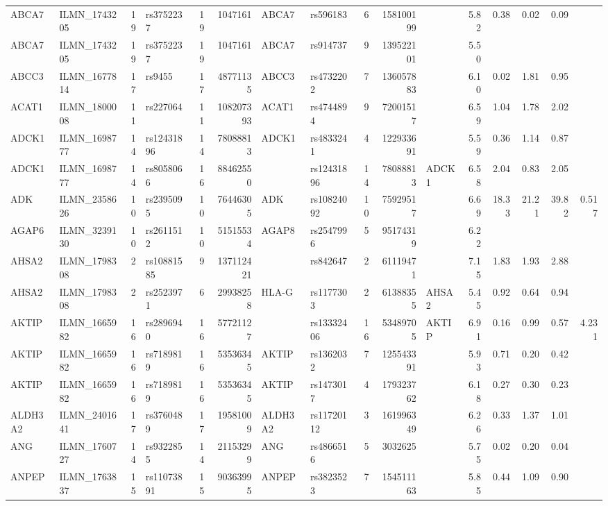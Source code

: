 \documentclass{article}
\begin{document}
\begin{landscape}
{\begin{ThreePartTable}
\begin{longtable}{|llr|lrrl|lrrl|rrrr|r|}
ABCA7 & ILMN\_1743205 & 19 & rs3752237 & 19 & 1047161 & ABCA7 & rs596183 & 6 & 158100199 &  & 5.82 & 0.38\tnote{i} & 0.02\tnote{i} & 0.09\tnote{j} &  \\
ABCA7 & ILMN\_1743205 & 19 & rs3752237 & 19 & 1047161 & ABCA7 & rs914737 & 9 & 139522101 &  & 5.50 &  &  &  &  \\
ABCC3 & ILMN\_1677814 & 17 & rs9455 & 17 & 48771135 & ABCC3 & rs4732202 & 7 & 136057883 &  & 6.10 & 0.02 & 1.81 & 0.95 &  \\
ACAT1 & ILMN\_1800008 & 11 & rs227064 & 11 & 108207393 & ACAT1 & rs4744894 & 9 & 72001517 &  & 6.59 & 1.04 & 1.78 & 2.02 &  \\
ADCK1 & ILMN\_1698777 & 14 & rs12431896 & 14 & 78088813 & ADCK1 & rs4833241 & 4 & 122933691 &  & 5.59 & 0.36 & 1.14 & 0.87 &  \\
ADCK1 & ILMN\_1698777 & 14 & rs8058066 & 16 & 88462550 &  & rs12431896 & 14 & 78088813 & ADCK1 & 6.58 & 2.04 & 0.83 & 2.05 &  \\
ADK & ILMN\_2358626 & 10 & rs2395095 & 10 & 76446305 & ADK & rs10824092 & 10 & 75929517 &  & 6.69 & 18.33 & 21.21 & 39.82 & 0.517 \\
AGAP6 & ILMN\_3239130 & 10 & rs2611512 & 10 & 51515534 & AGAP8 & rs2547996 & 5 & 95174319 &  & 6.22 &  &  &  &  \\
AHSA2 & ILMN\_1798308 & 2 & rs10881585 & 9 & 137112421 &  & rs842647 & 2 & 61119471 &  & 7.15 & 1.83 & 1.93 & 2.88 &  \\
AHSA2 & ILMN\_1798308 & 2 & rs2523971 & 6 & 29938258 & HLA-G & rs1177303 & 2 & 61388355 & AHSA2 & 5.45 & 0.92 & 0.64 & 0.94 &  \\
AKTIP & ILMN\_1665982 & 16 & rs2896940 & 16 & 57721127 &  & rs13332406 & 16 & 53489705 & AKTIP & 6.91 & 0.16 & 0.99 & 0.57 & 4.231 \\
AKTIP & ILMN\_1665982 & 16 & rs7189819 & 16 & 53536345 & AKTIP & rs1362032 & 7 & 125543391 &  & 5.93 & 0.71 & 0.20 & 0.42 &  \\
AKTIP & ILMN\_1665982 & 16 & rs7189819 & 16 & 53536345 & AKTIP & rs1473017 & 4 & 179323762 &  & 6.18 & 0.27 & 0.30 & 0.23 &  \\
ALDH3A2 & ILMN\_2401641 & 17 & rs3760489 & 17 & 19581009 & ALDH3A2 & rs11720112 & 3 & 161996349 &  & 6.26 & 0.33 & 1.37 & 1.01 &  \\
ANG & ILMN\_1760727 & 14 & rs9322855 & 14 & 21153299 & ANG & rs4866516 & 5 & 3032625 &  & 5.75 & 0.02 & 0.20 & 0.04 &  \\
ANPEP & ILMN\_1763837 & 15 & rs11073891 & 15 & 90363995 & ANPEP & rs3823523 & 7 & 154511163 &  & 5.85 & 0.44 & 1.09 & 0.90 &  \\

\end{longtable}
\end{ThreePartTable}}
\end{landscape}
\end{document}
